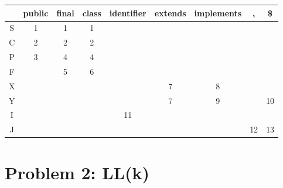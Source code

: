 \documentclass{article}
\begin{document}
\begin{enumerate}[i.]
		\begin{tabular}{|c|c|c|c|c|c|c|c|c|}
			                                                                            \hline
			  & public & final & class & identifier & extends & implements &  , & \$ \\ \hline
			S &    1   &   1   &   1   &            &         &            &    &    \\ \hline
			C &    2   &   2   &   2   &            &         &            &    &    \\ \hline
			P &    3   &   4   &   4   &            &         &            &    &    \\ \hline
			F &        &   5   &   6   &            &         &            &    &    \\ \hline
			X &        &       &       &            &    7    &      8     &    &    \\ \hline
			Y &        &       &       &            &    7    &      9     &    & 10 \\ \hline
			I &        &       &       &     11     &         &            &    &    \\ \hline
			J &        &       &       &            &         &            & 12 & 13 \\ \hline
		\end{tabular}
\end{enumerate}

\section{Problem 2: LL(k)}
\end{document}
